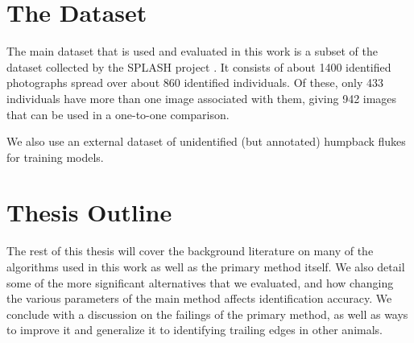 
\section{The Dataset}

The main dataset that is used and evaluated in this work is a subset of the dataset collected by the SPLASH project \cite{calambokidis2008splash}. 
It consists of about 1400 identified photographs spread over about 860 identified individuals.
Of these, only 433 individuals have more than one image associated with them, giving 942 images that can be used in a one-to-one comparison.

We also use an external dataset of unidentified (but annotated) humpback flukes for training models.

\section{Thesis Outline}

The rest of this thesis will cover the background literature on many of the algorithms used in this work as well as the primary method itself.
We also detail some of the more significant alternatives that we evaluated, and how changing the various parameters of the main method affects identification accuracy.
We conclude with a discussion on the failings of the primary method, as well as ways to improve it and generalize it to identifying trailing edges in other animals.





